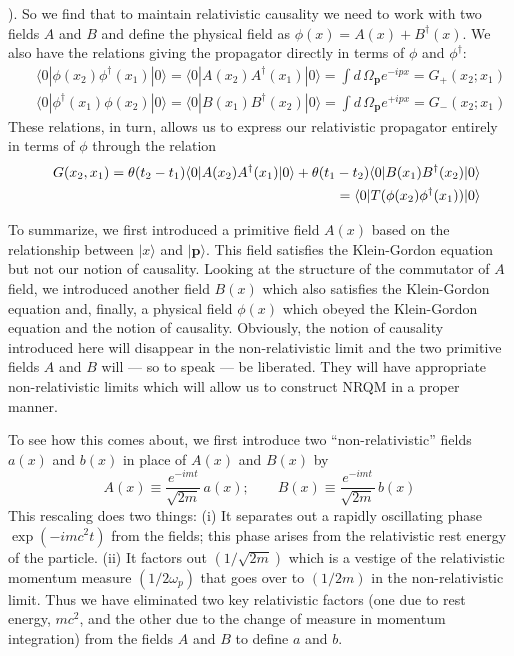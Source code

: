 \documentclass[12pt]{article}
\def\ket#1{|#1\rangle}                    %
\def\bk#1#2#3{{\langle #1|#2|#3\rangle}}  %
\begin{document}
). 
So we find that to maintain relativistic causality we need to work with two fields $A$ and $B$ and define the physical field as $
 \phi(x) = A(x) + B^\dagger(x)
$.
We also have the relations giving the propagator directly in terms of $\phi$ and $\phi^\dagger$:
  \begin{eqnarray}
 &&\bk{0} {\phi(x_2) \phi^\dagger(x_1)}{0} =\bk{0} {A(x_2) A^\dagger(x_1)}{0}
 = \int d\,\Omega_{\bm{p}} e^{-ipx} = G_+(x_2;x_1) \nonumber\\
&&\bk{0} {\phi^\dagger(x_1) \phi(x_2)}{0} = \bk{0} {B(x_1) B^\dagger(x_2)}{0}
=\int d\,\Omega_{\bm{p}} e^{+ipx} = G_-(x_2;x_1)
\label{fieldexps}
\end{eqnarray} 
  These relations, in turn, allows us to express our relativistic propagator  entirely in terms of $\phi$ through the relation 
\begin{eqnarray}
 &&G(x_2,x_1) 
 =\theta(t_2-t_1) \bk{0}{A(x_2)A^\dagger(x_1)}{0} + \theta(t_1-t_2) \bk{0}{B(x_1)B^\dagger(x_2)}{0}\nonumber\\
 &&\hskip 5cm =  \bk{0}{T(\phi(x_2)\phi^\dagger(x_1))}{0}
 \label{conc1}
\end{eqnarray} 
 
 To summarize, we first introduced a primitive field $A(x)$  based on the relationship between 
  $\ket{x}$ and $\ket{\bm{p}}$. This field satisfies the Klein-Gordon equation but not our notion of causality. Looking at the structure of the commutator of $A$ field, we introduced another field $B(x)$ which also satisfies the Klein-Gordon equation and, finally, a physical field  $\phi(x)$ which obeyed the Klein-Gordon equation and the notion of causality. Obviously, the notion of causality introduced here will disappear in the non-relativistic limit and the two primitive fields $A$ and $B$ will --- so to speak --- be liberated. They will have appropriate non-relativistic limits which will allow us to construct NRQM in a proper manner. 

  To see how this comes about, we first introduce two  ``non-relativistic''  fields $a(x)$ and $b(x)$ in place of $A(x)$ and $B(x)$ by
  \begin{equation}
 A(x) \equiv \frac{e^{-imt}}{\sqrt{2m}} \, a(x); \qquad B(x)\equiv \frac{e^{-imt}}{\sqrt{2m}}\, b(x)
\end{equation} 
 This rescaling does two things: (i) It separates out a rapidly oscillating phase $\exp(-i mc^2t)$ from the fields; this phase arises from the relativistic rest energy of the particle. (ii) It factors out $(1/\sqrt{2m})$ which is a vestige of the relativistic momentum measure $(1/2\omega_p)$ that goes over to $(1/2m)$ in the non-relativistic limit. Thus we have eliminated two key relativistic factors (one due to rest energy, $mc^2$, and the other due to the change of measure in momentum integration) from the fields $A$ and $B$ to define $a$ and $b$. 
 
\end{document}
